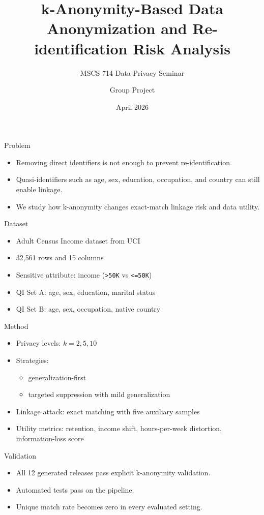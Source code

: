 \documentclass[aspectratio=169]{beamer}
\title{k-Anonymity-Based Data Anonymization and Re-identification Risk Analysis}
\subtitle{MSCS 714 Data Privacy Seminar}
\author{Group Project}
\date{April 2026}
\begin{document}
\begin{frame}
    \titlepage
\end{frame}

\begin{frame}{Problem}
    \begin{itemize}
        \item Removing direct identifiers is not enough to prevent re-identification.
        \item Quasi-identifiers such as age, sex, education, occupation, and country can still enable linkage.
        \item We study how k-anonymity changes exact-match linkage risk and data utility.
    \end{itemize}
\end{frame}

\begin{frame}{Dataset}
    \begin{itemize}
        \item Adult Census Income dataset from UCI
        \item 32,561 rows and 15 columns
        \item Sensitive attribute: income (\texttt{>50K} vs \texttt{<=50K})
        \item QI Set A: age, sex, education, marital status
        \item QI Set B: age, sex, occupation, native country
    \end{itemize}
\end{frame}

\begin{frame}{Method}
    \begin{itemize}
        \item Privacy levels: $k=2,5,10$
        \item Strategies:
        \begin{itemize}
            \item generalization-first
            \item targeted suppression with mild generalization
        \end{itemize}
        \item Linkage attack: exact matching with five auxiliary samples
        \item Utility metrics: retention, income shift, hours-per-week distortion, information-loss score
    \end{itemize}
\end{frame}

\begin{frame}{Validation}
    \begin{itemize}
        \item All 12 generated releases pass explicit k-anonymity validation.
        \item Automated tests pass on the pipeline.
        \item Unique match rate becomes zero in every evaluated setting.
    \end{itemize}
\end{frame}
\end{document}
